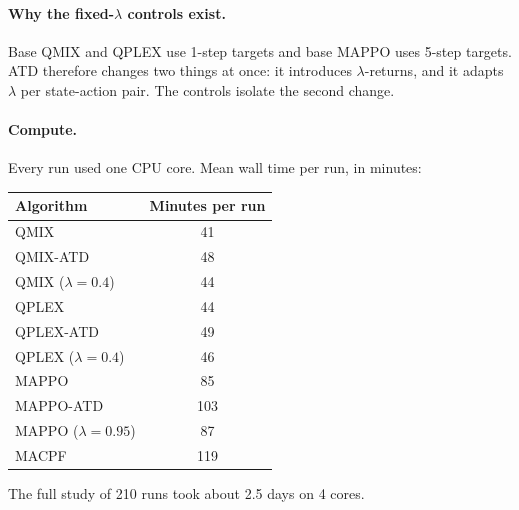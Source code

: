 \paragraph{Why the fixed-$\lambda$ controls exist.} Base QMIX and QPLEX use 1-step targets and
base MAPPO uses 5-step targets. ATD therefore changes two things at once: it introduces
$\lambda$-returns, and it adapts $\lambda$ per state-action pair. The controls isolate the
second change.

\paragraph{Compute.} Every run used one CPU core. Mean wall time per run, in minutes:

\begin{center}\small
\begin{tabular}{l c}
\toprule
Algorithm & Minutes per run \\
\midrule
QMIX & 41 \\
QMIX-ATD & 48 \\
QMIX ($\lambda=0.4$) & 44 \\
QPLEX & 44 \\
QPLEX-ATD & 49 \\
QPLEX ($\lambda=0.4$) & 46 \\
MAPPO & 85 \\
MAPPO-ATD & 103 \\
MAPPO ($\lambda=0.95$) & 87 \\
MACPF & 119 \\
\bottomrule
\end{tabular}
\end{center}

The full study of 210 runs took about 2.5 days on 4 cores.
